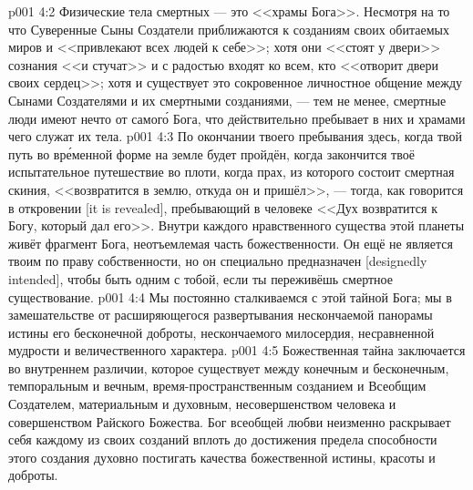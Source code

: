 \vs p001 4:2 Физические тела смертных --- это <<храмы Бога>>. Несмотря на то что Суверенные Сыны Создатели приближаются к созданиям своих обитаемых миров и <<привлекают всех людей к себе>>; хотя они <<стоят у двери>> сознания <<и стучат>> и с радостью входят ко всем, кто <<отворит двери своих сердец>>; хотя и существует это сокровенное личностное общение между Сынами Создателями и их смертными созданиями, --- тем не менее, смертные люди имеют нечто от самог\'о Бога, что действительно пребывает в них и храмами чего служат их тела.
\vs p001 4:3 По окончании твоего пребывания здесь, когда твой путь во вр\'еменной форме на земле будет пройдён, когда закончится твоё испытательное путешествие во плоти, когда прах, из которого состоит смертная скиния, <<возвратится в землю, откуда он и пришёл>>, --- тогда, как говорится в откровении [it is revealed], пребывающий в человеке <<Дух возвратится к Богу, который дал его>>. Внутри каждого нравственного существа этой планеты живёт фрагмент Бога, неотъемлемая часть божественности. Он ещё не является твоим по праву собственности, но он специально предназначен [designedly intended], чтобы быть одним с тобой, если ты переживёшь смертное существование.
\vs p001 4:4 \pc Мы постоянно сталкиваемся с этой тайной Бога; мы в замешательстве от расширяющегося развертывания нескончаемой панорамы истины его бесконечной доброты, нескончаемого милосердия, несравненной мудрости и величественного характера.
\vs p001 4:5 \pc Божественная тайна заключается во внутреннем различии, которое существует между конечным и бесконечным, темпоральным и вечным, время\hyp{}пространственным созданием и Всеобщим Создателем, материальным и духовным, несовершенством человека и совершенством Райского Божества. Бог всеобщей любви неизменно раскрывает себя каждому из своих созданий вплоть до достижения предела способности этого создания духовно постигать качества божественной истины, красоты и доброты.
